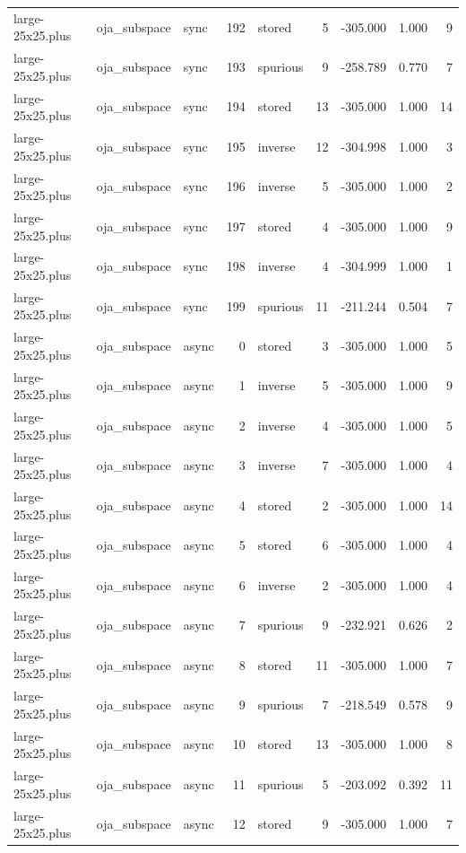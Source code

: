\begin{tabular}{lllrlrrrr}
large-25x25.plus & oja\_subspace & sync & 192 & stored & 5 & -305.000 & 1.000 & 9 \\
large-25x25.plus & oja\_subspace & sync & 193 & spurious & 9 & -258.789 & 0.770 & 7 \\
large-25x25.plus & oja\_subspace & sync & 194 & stored & 13 & -305.000 & 1.000 & 14 \\
large-25x25.plus & oja\_subspace & sync & 195 & inverse & 12 & -304.998 & 1.000 & 3 \\
large-25x25.plus & oja\_subspace & sync & 196 & inverse & 5 & -305.000 & 1.000 & 2 \\
large-25x25.plus & oja\_subspace & sync & 197 & stored & 4 & -305.000 & 1.000 & 9 \\
large-25x25.plus & oja\_subspace & sync & 198 & inverse & 4 & -304.999 & 1.000 & 1 \\
large-25x25.plus & oja\_subspace & sync & 199 & spurious & 11 & -211.244 & 0.504 & 7 \\
large-25x25.plus & oja\_subspace & async & 0 & stored & 3 & -305.000 & 1.000 & 5 \\
large-25x25.plus & oja\_subspace & async & 1 & inverse & 5 & -305.000 & 1.000 & 9 \\
large-25x25.plus & oja\_subspace & async & 2 & inverse & 4 & -305.000 & 1.000 & 5 \\
large-25x25.plus & oja\_subspace & async & 3 & inverse & 7 & -305.000 & 1.000 & 4 \\
large-25x25.plus & oja\_subspace & async & 4 & stored & 2 & -305.000 & 1.000 & 14 \\
large-25x25.plus & oja\_subspace & async & 5 & stored & 6 & -305.000 & 1.000 & 4 \\
large-25x25.plus & oja\_subspace & async & 6 & inverse & 2 & -305.000 & 1.000 & 4 \\
large-25x25.plus & oja\_subspace & async & 7 & spurious & 9 & -232.921 & 0.626 & 2 \\
large-25x25.plus & oja\_subspace & async & 8 & stored & 11 & -305.000 & 1.000 & 7 \\
large-25x25.plus & oja\_subspace & async & 9 & spurious & 7 & -218.549 & 0.578 & 9 \\
large-25x25.plus & oja\_subspace & async & 10 & stored & 13 & -305.000 & 1.000 & 8 \\
large-25x25.plus & oja\_subspace & async & 11 & spurious & 5 & -203.092 & 0.392 & 11 \\
large-25x25.plus & oja\_subspace & async & 12 & stored & 9 & -305.000 & 1.000 & 7 \\

\end{tabular}

